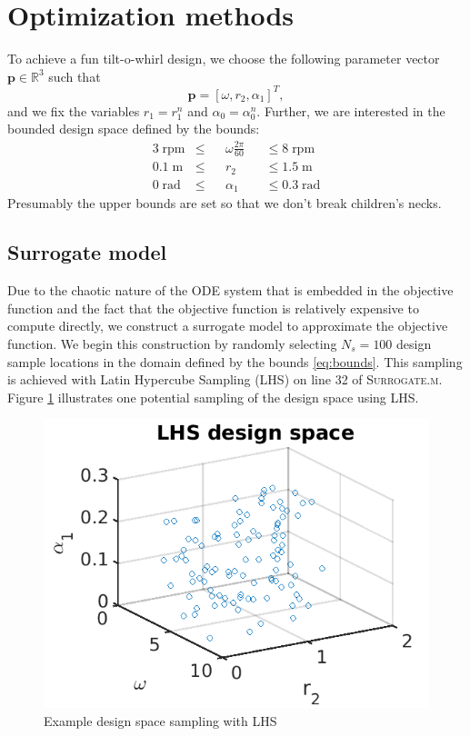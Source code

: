 \documentclass[11pt]{article}
\newcommand{\bs}[1] {\boldsymbol{#1}}
\begin{document}
\section{Optimization methods}

To achieve a fun tilt-o-whirl design, we choose the
following parameter vector $\bs{p} \in \mathbb{R}^3$ such that
%
\begin{equation}
\bs{p} = [ \omega,  r_2,  \alpha_1 ]^T,
\end{equation}
%
and we fix the variables $r_1 = r_1^n$
and $\alpha_0 = \alpha_0^n$. Further, we are interested
in the bounded design space defined by the bounds:
%
\begin{equation}
\begin{aligned}
3 \; \text{rpm} & \leq && \omega \frac{2 \pi}{60} &&\leq 8 \; \text{rpm} \\
0.1 \; \text{m} & \leq && r_2 &&\leq 1.5 \; \text{m} \\
0 \; \text{rad} & \leq && \alpha_1 &&\leq 0.3 \; \text{rad}
\label{eq:bounds}
\end{aligned}
\end{equation}
%
Presumably the upper bounds are set so that we don't
break children's necks.

\subsection{Surrogate model}

Due to the chaotic nature of the ODE system that is embedded in
the objective function and the fact that the objective function
is relatively expensive to compute directly, we construct a
surrogate model to approximate the objective function. We begin
this construction by randomly selecting $N_s = 100$ design sample
locations in the domain defined by the bounds \eqref{eq:bounds}.
This sampling is achieved with Latin Hypercube Sampling (LHS)
on line 32 of \textsc{Surrogate.m}. Figure \ref{fig:lhs}
illustrates one potential sampling of the design space using
LHS.

\begin{figure}[hbt!]
\centering
\includegraphics[width=.5\linewidth]{designspace}
\caption{Example design space sampling with LHS}
\label{fig:lhs}
\end{figure}
\end{document}
